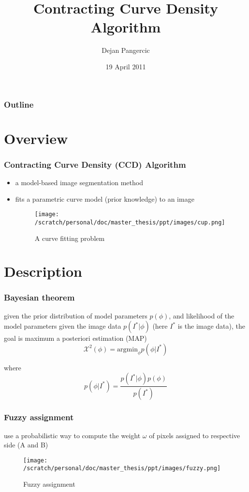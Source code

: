 \documentclass[english,10pt,presentation]{beamer}
\begin{document}
\title{Contracting Curve Density Algorithm}
\author{Dejan Pangercic}
\date{19 April 2011}
\maketitle

\begin{frame}
\frametitle{Outline}
\setcounter{tocdepth}{2}
\tableofcontents
\end{frame}

\section{Overview}
\label{sec-1}
\begin{frame}
\frametitle{Contracting Curve Density (CCD) Algorithm}
\label{sec-1_1}
\begin{itemize}

\item a model-based image segmentation method\\
\label{sec-1_1_1}%
\item fits a parametric curve model (prior knowledge) to an image\\
\label{sec-1_1_2}%
\begin{figure}[htb]
\centering
\texttt{[image: /scratch/personal/doc/master\_thesis/ppt/images/cup.png]}
\caption{\label{fig:1}A curve fitting problem}
\end{figure}

\end{itemize} %
\end{frame}
\section{Description}
\label{sec-2}
\begin{frame}
\frametitle{Bayesian theorem}
\label{sec-2_1}

    given the prior distribution of model parameters $p(\phi)$, and
    likelihood of the model parameters given the image data
    $p(I^*|\phi)$ (here $I^{*}$ is the image data), the goal is
    maximum a posteriori estimation (MAP)
\begin{displaymath}
\mathcal{X}^2(\phi) = \mathrm{argmin}_{\phi} p(\phi|I^*)
\end{displaymath}

where 
\begin{displaymath}
p(\phi|I^*) = \frac{p(I^*|\phi) p(\phi)}{p(I^{*})}
\end{displaymath}
\end{frame}
\begin{frame}
\frametitle{Fuzzy assignment}
\label{sec-2_2}

use a probabilistic way to compute the weight $\omega$ of pixels assigned to
respective side (A and B)
\begin{figure}[htb]
\centering
\texttt{[image: /scratch/personal/doc/master\_thesis/ppt/images/fuzzy.png]}
\caption{\label{fig:2}Fuzzy assignment}
\end{figure}
\end{frame}
\end{document}
